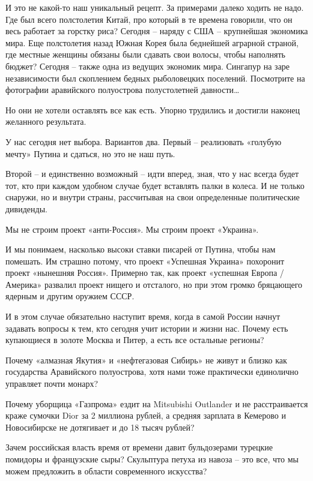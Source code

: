 И это не какой-то наш уникальный рецепт. За примерами далеко ходить не надо.
Где был всего полстолетия Китай, про который в те времена говорили, что он весь
работает за горстку риса? Сегодня – наряду с США – крупнейшая экономика мира.
Еще полстолетия назад Южная Корея была беднейшей аграрной страной, где местные
женщины обязаны были сдавать свои волосы, чтобы наполнять бюджет? Сегодня –
также одна из ведущих экономик мира. Сингапур на заре независимости был
скоплением бедных рыболовецких поселений. Посмотрите на фотографии аравийского
полуострова полустолетней давности…

Но они не хотели оставлять все как есть. Упорно трудились и достигли наконец
желанного результата.

У нас сегодня нет выбора. Вариантов два. Первый – реализовать «голубую мечту»
Путина и сдаться, но это не наш путь. 

Второй – и единственно возможный – идти вперед, зная, что у нас всегда будет
тот, кто при каждом удобном случае будет вставлять палки в колеса. И не только
снаружи, но и внутри страны, рассчитывая на свои определенные политические
дивиденды.

Мы не строим проект «анти-Россия». Мы строим проект «Украина».

И мы понимаем, насколько высоки ставки писарей от Путина, чтобы нам помешать.
Им страшно потому, что проект «Успешная Украина» похоронит проект «нынешняя
Россия». Примерно так, как проект «успешная Европа / Америка» развалил проект
нищего и отсталого, но при этом громко бряцающего ядерным и другим оружием
СССР.

И в этом случае обязательно наступит время, когда в самой России начнут
задавать вопросы к тем, кто сегодня учит истории и жизни нас. Почему есть
купающиеся в золоте Москва и Питер, а есть все остальные регионы? 

Почему «алмазная Якутия» и «нефтегазовая Сибирь» не живут и близко как
государства Аравийского полуострова, хотя нами тоже практически единолично
управляет почти монарх? 

Почему уборщица «Газпрома» ездит на Mitsubishi Outlander и не расстраивается
краже сумочки Dior за 2 миллиона рублей, а средняя зарплата в Кемерово и
Новосибирске не дотягивает и до 18 тысяч рублей? 

Зачем российская власть время от времени давит бульдозерами турецкие помидоры и
французские сыры? Скульптура петуха из навоза – это все, что мы можем
предложить в области современного искусства? 

